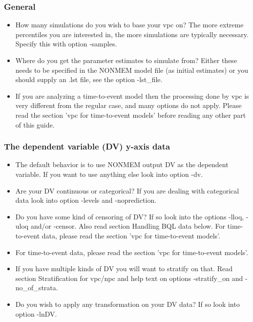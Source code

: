 \subsubsection*{General}

\begin{itemize}
	\item How many simulations do you wish to base your vpc on? The more extreme percentiles you are interested in, the more simulations are typically necessary. Specify this with option -samples.
	\item Where do you get the parameter estimates to simulate from? Either these needs to be specified in the NONMEM model file (as initial estimates) or you should supply an .lst file, see the option -lst\_file.
	\item If you are analyzing a time-to-event model then the processing done by vpc is very different from the regular case, and many options do not apply. Please read the section 'vpc for time-to-event models' before reading any other part of this guide.
\end{itemize}

\subsubsection*{The dependent variable (DV) y-axis data}

\begin{itemize}
	\item The default behavior is to use NONMEM output DV as the dependent variable. If you want to use anything else look into option -dv.
	\item Are your DV continuous or categorical? If you are dealing with categorical data look into option -levels and -noprediction.
	\item Do you have some kind of censoring of DV? If so look into the options -lloq, -uloq and/or -censor. Also read section Handling BQL data below. For time-to-event data, please read the section 'vpc for time-to-event models'.
	\item For time-to-event data, please read the section 'vpc for time-to-event models'.
	\item If you have multiple kinds of DV you will want to stratify on that. Read section Stratification for vpc/npc and help text on options -stratify\_on and -no\_of\_strata.
	\item Do you wish to apply any transformation on your DV data? If so look into option -lnDV.
\end{itemize}

